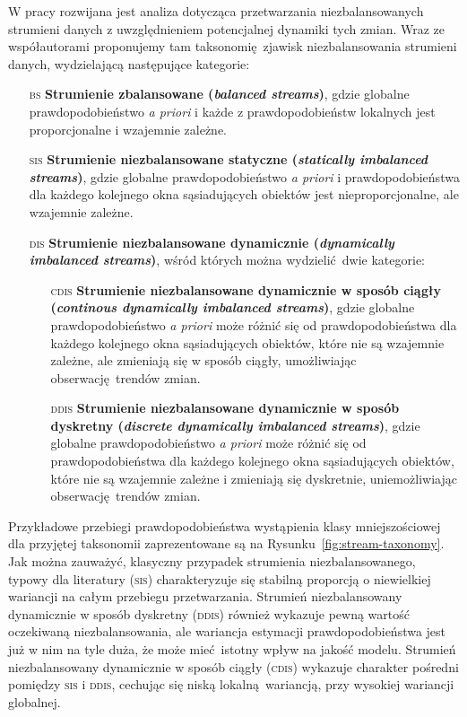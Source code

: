 W pracy rozwijana jest analiza dotycząca przetwarzania niezbalansowanych strumieni danych z uwzględnieniem potencjalnej dynamiki tych zmian. Wraz ze współautorami proponujemy tam taksonomię zjawisk niezbalansowania strumieni danych, wydzielającą następujące kategorie:

\begin{itemize}
	\item[\textsc{bs}] \textbf{Strumienie zbalansowane (\emph{balanced streams})}, gdzie globalne prawdopodobieństwo \emph{a priori} i każde z prawdopodobieństw lokalnych jest proporcjonalne i wzajemnie zależne.
	\item[\textsc{sis}] \textbf{Strumienie niezbalansowane statyczne (\emph{statically imbalanced streams})}, gdzie globalne prawdopodobieństwo \emph{a priori} i prawdopodobieństwa dla każdego kolejnego okna sąsiadujących obiektów jest nieproporcjonalne, ale wzajemnie zależne.
	\item[\textsc{dis}] \textbf{Strumienie niezbalansowane dynamicznie (\emph{dynamically imbalanced streams})}, wśród których można wydzielić dwie kategorie:
	\begin{itemize}
		\item[\textsc{cdis}] \textbf{Strumienie niezbalansowane dynamicznie w sposób ciągły (\emph{continous dynamically imbalanced streams})}, gdzie globalne prawdopodobieństwo \emph{a priori} może różnić się od prawdopodobieństwa dla każdego kolejnego okna sąsiadujących obiektów, które nie są wzajemnie zależne, ale zmieniają się w sposób ciągły, umożliwiając obserwację trendów zmian.
		\item[\textsc{ddis}] \textbf{Strumienie niezbalansowane dynamicznie w sposób dyskretny (\emph{discrete dynamically imbalanced streams})}, gdzie globalne prawdopodobieństwo \emph{a priori} może różnić się od prawdopodobieństwa dla każdego kolejnego okna sąsiadujących obiektów, które nie są wzajemnie zależne i zmieniają się dyskretnie, uniemożliwiając obserwację trendów zmian. 
	\end{itemize}
\end{itemize}

Przykładowe przebiegi prawdopodobieństwa wystąpienia klasy mniejszościowej dla przyjętej taksonomii zaprezentowane są na Rysunku~\ref{fig:stream-taxonomy}. Jak można zauważyć, klasyczny przypadek strumienia niezbalansowanego, typowy dla literatury (\textsc{sis}) charakteryzuje się stabilną proporcją o niewielkiej wariancji na całym przebiegu przetwarzania. Strumień niezbalansowany dynamicznie w sposób dyskretny (\textsc{ddis}) również wykazuje pewną wartość oczekiwaną niezbalansowania, ale wariancja estymacji prawdopodobieństwa jest już w nim na tyle duża, że może mieć istotny wpływ na jakość modelu. Strumień niezbalansowany dynamicznie w sposób ciągły (\textsc{cdis}) wykazuje charakter pośredni pomiędzy \textsc{sis} i \textsc{ddis}, cechując się niską lokalną wariancją, przy wysokiej wariancji globalnej.

